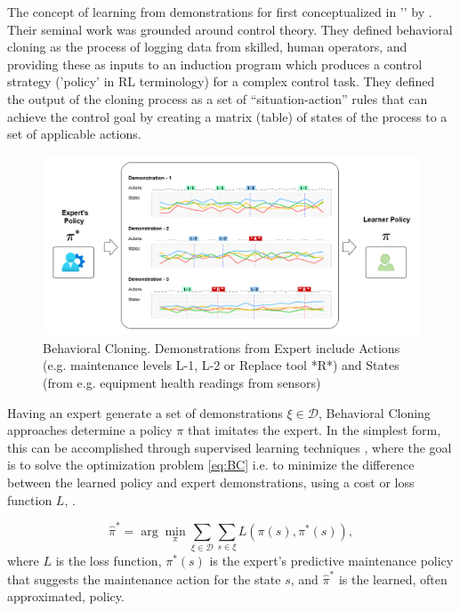 \documentclass{article}
\begin{document}
The concept of learning from demonstrations for first conceptualized in '' by \cite{BC-bain1995}. Their seminal work was grounded around control theory. They defined behavioral cloning as the process of logging data from skilled, human operators, and providing these as inputs to an induction program which produces a control strategy ('policy' in RL terminology) for a complex control task. They defined the output of the cloning process as a set of ``situation-action'' rules that can achieve the control goal by creating a matrix (table) of states of the process to a set of applicable actions.

\begin{figure}[H]
	\centering
	\includegraphics[width=\linewidth]{images/BC_Diagram.png}
	\caption{Behavioral Cloning. Demonstrations from Expert include Actions (e.g. maintenance levels L-1, L-2 or Replace tool *R*) and States (from e.g. equipment health readings from sensors)}
	\label{fig:BC}
\end{figure}

Having an expert generate a set of demonstrations $\xi \in \mathcal{D}$, Behavioral Cloning approaches determine a policy $\pi$ that imitates the expert. In the simplest form, this can be accomplished through supervised learning techniques \citep{abbeel2004apprenticeship, yue2018imitation}, where the goal is to solve the optimization problem \eqref{eq:BC} i.e. to minimize the difference between the learned policy and expert demonstrations, using a cost or loss function $L$, \citep{stanford-lectures}.  

\begin{equation}\label{eq:BC}
	\hat{\pi}^* = \arg\min_{\pi} \sum_{\xi \in \mathcal{D}} \sum_{s \in \xi} L(\pi(s), \pi^*(s)),
\end{equation}
where $L$ is the loss function, $\pi^*(s)$ is the expert's predictive maintenance policy that suggests the maintenance action for the state $s$, and $\hat{\pi}^*$ is the learned, often approximated, policy.
\end{document}
